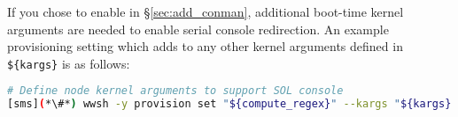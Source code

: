 If you chose to enable \conman{} in \S\ref{sec:add_conman}, additional
boot-time kernel arguments are needed to enable serial console
redirection. An example provisioning setting which adds to any other kernel arguments defined
in \texttt{\$\{kargs\}} is as follows:

\begin{lstlisting}[language=bash,keywords={},upquote=true]
# Define node kernel arguments to support SOL console
[sms](*\#*) wwsh -y provision set "${compute_regex}" --kargs "${kargs} console=ttyS1,115200"
\end{lstlisting}
